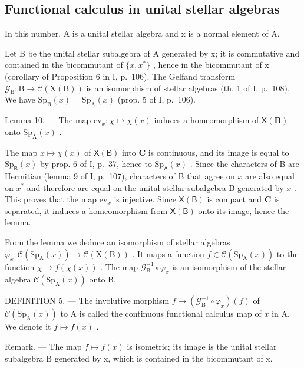 \subsection{Functional calculus in unital stellar algebras}

In this number, A is a unital stellar algebra and x is a normal element of A.

Let B be the unital stellar subalgebra of A generated by x; it is commutative and contained in the bicommutant of \(\{x, x^{*}\}\) , hence in the bicommutant of x (corollary of Proposition 6 in I, p.~106). The Gelfand transform \(\mathcal{G}_{\mathrm{B}}: \mathrm{B} \to \mathcal{C}(\mathrm{X}(\mathrm{B}))\) is an isomorphism of stellar algebras (th. 1 of I, p.~108). We have \(\mathrm{Sp}_{\mathrm{B}}(x) = \mathrm{Sp}_{\mathrm{A}}(x)\) (prop. 5 of I, p.~106).

Lemma 10. --- The map \(\mathrm{ev}_x\colon \chi \mapsto \chi (x)\) induces a homeomorphism of \(\mathsf{X}(\mathbf{B})\) onto \(\mathrm{Sp}_{\mathrm{A}}(x)\) .

The map \(x \mapsto \chi(x)\) of \(\mathsf{X}(\mathsf{B})\) into \(\mathbf{C}\) is continuous, and its image is equal to \(\mathrm{Sp}_{\mathsf{B}}(x)\) by prop. 6 of I, p.~37, hence to \(\mathrm{Sp}_{\mathsf{A}}(x)\) . Since the characters of B are Hermitian (lemma 9 of I, p.~107), characters of B that agree on \(x\) are also equal on \(x^{*}\) and therefore are equal on the unital stellar subalgebra B generated by \(x\) . This proves that the map \(\mathrm{ev}_x\) is injective. Since \(\mathsf{X}(\mathsf{B})\) is compact and \(\mathbf{C}\) is separated, it induces a homeomorphism from \(\mathsf{X}(\mathsf{B})\) onto its image, hence the lemma.

From the lemma we deduce an isomorphism of stellar algebras \(\varphi_x\colon \mathcal{C}(\mathrm{Sp}_{\mathrm{A}}(x))\to \mathcal{C}(\mathrm{X(B)})\) . It maps a function \(f\in \mathcal{C}(\mathrm{Sp}_{\mathrm{A}}(x))\) to the function \(\chi \mapsto f(\chi (x))\) . The map \(\mathcal{G}_{\mathrm{B}}^{-1}\circ \varphi_{x}\) is an isomorphism of the stellar algebra \(\mathcal{C}(\mathrm{Sp}_{\mathrm{A}}(x))\) onto B.

DEFINITION 5. --- The involutive morphism \(f \mapsto (\mathcal{G}_{\mathrm{B}}^{-1} \circ \varphi_x)(f)\) of \(\mathcal{C}(\mathrm{Sp}_{\mathrm{A}}(x))\) to A is called the continuous functional calculus map of \(x\) in A. We denote it \(f \mapsto f(x)\) .

Remark. --- The map \(f \mapsto f(x)\) is isometric; its image is the unital stellar subalgebra B generated by x, which is contained in the bicommutant of x.

